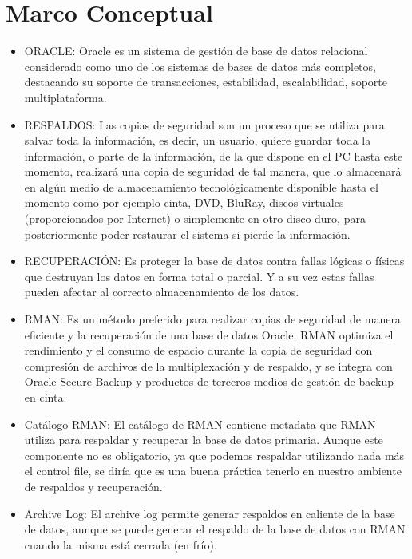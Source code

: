 \documentclass[a4paper,openright,12pt]{book}
\begin{document}
\section{Marco Conceptual}\label{se:nudo}
\begin{itemize}
 \item ORACLE: Oracle es un sistema de gestión de base de datos relacional considerado como uno de los sistemas de bases de datos más completos, destacando su soporte de transacciones, estabilidad, escalabilidad, soporte multiplataforma.

 \item RESPALDOS: Las copias de seguridad son un proceso que se utiliza para salvar toda la información, es decir, un usuario, quiere guardar toda la información, o parte de la información, de la que dispone en el PC hasta este momento, realizará una copia de seguridad de tal manera, que lo almacenará en algún medio de almacenamiento tecnológicamente disponible hasta el momento como por ejemplo cinta, DVD, BluRay, discos virtuales (proporcionados por Internet) o simplemente en otro disco duro, para posteriormente poder restaurar el sistema si pierde la información.

 \item RECUPERACIÓN: Es proteger la base de datos contra fallas lógicas o físicas que destruyan los datos en forma total o parcial. Y a su vez estas fallas pueden afectar al correcto almacenamiento de los datos.

 \item RMAN: Es un método preferido para realizar copias de seguridad de manera eficiente y la recuperación de una base de datos Oracle. RMAN optimiza el rendimiento y el consumo de espacio durante la copia de seguridad con compresión de archivos de la multiplexación y de respaldo, y se integra con Oracle Secure Backup y productos de terceros medios de gestión de backup en cinta.

 \item Catálogo RMAN: El catálogo de RMAN contiene metadata que RMAN utiliza para respaldar y recuperar la base de datos primaria. Aunque este componente no es obligatorio, ya que podemos respaldar utilizando nada más el control file, se diría que es una buena práctica tenerlo en nuestro ambiente de respaldos y recuperación.

 \item Archive Log: El archive log permite generar respaldos en caliente de la base de datos, aunque se puede generar el respaldo de la base de datos con RMAN cuando la misma está cerrada (en frío).


\end{itemize}
\end{document}
